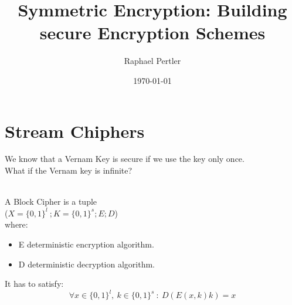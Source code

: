 \documentclass[twocolumn]{article}
\title{\textbf{Symmetric Encryption: Building secure Encryption Schemes }}
\author{ Raphael Pertler }
\date{\today}
\begin{document}
\maketitle

\section*{Stream Chiphers}
\begin{question}
  We know that a Vernam Key is secure if we use the key only once.\\
  What if the Vernam key is infinite?\\
  \\

\end{question}

\begin{question}
  A Block Cipher is a tuple\\
  (\( X = \{0,1\}^l \ ; K = \{0,1\}^s ; E ; D \)) \\
  where: \\
  \begin{itemize}
    \item E deterministic encryption algorithm.
    \item D deterministic decryption algorithm.
  \end{itemize}

  It has to satisfy: \\
  \[  \forall x \in \{0,1\}^l , \ k \in \{0,1\}^s \ : \ D(E(x,k)k) = x \]
\end{question}
\end{document}
